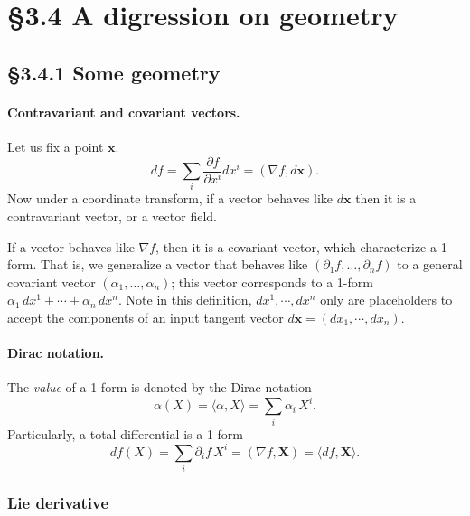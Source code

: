 \documentclass{article}
\begin{document}
\title{}
\author{ \vspace{-10ex} }
\date{ \vspace{-10ex} }
\maketitle


\section{\S 3.4 A digression on geometry}


\subsection{\S 3.4.1 Some geometry}

\paragraph{Contravariant and covariant vectors.}

Let us fix a point $\mathbf x$.
$$
df
= \sum_i \frac{\partial f}{\partial x^i} dx^i
= (\nabla f, d\mathbf x).
$$
Now under a coordinate transform,
if a vector behaves like $d\mathbf x$
then it is a contravariant vector, or a vector field.

If a vector behaves like $\nabla f$,
then it is a covariant vector,
which characterize a 1-form.
%
That is, we generalize a vector that behaves like
$(\partial_1 f, \dots, \partial_n f)$
to a general covariant vector
$(\alpha_1, \dots, \alpha_n)$;
this vector corresponds to a 1-form
$\alpha_1 \, dx^1 + \cdots + \alpha_n \, dx^n$.
Note in this definition,
$dx^1, \cdots, dx^n$ only
are placeholders to accept the components
of an input tangent vector $d\mathbf x = (dx_1, \cdots, dx_n)$.



\paragraph{Dirac notation.}

The \emph{value} of a 1-form is denoted by the Dirac notation
$$
\alpha(X)
=
\langle \alpha, X \rangle
=
\sum_i \alpha_i \, X^i.
$$
Particularly, a total differential is a 1-form
$$
df(X) = \sum_i \partial_i f \, X^i
= ( \nabla f, \mathbf X ) = \langle df, \mathbf X \rangle.
$$


\subsubsection{Lie derivative}
\end{document}
